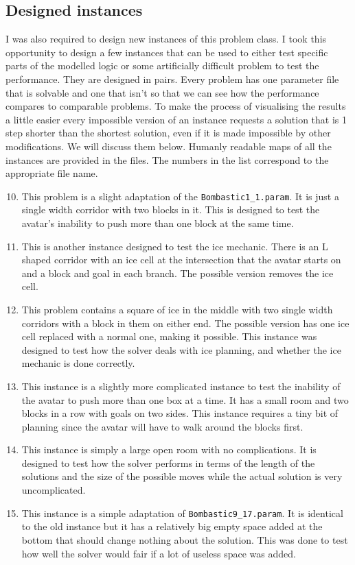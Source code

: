 \documentclass[british]{article}
\newcommand{\code}[1]{\texttt{#1}}
\begin{document}
	\subsection{Designed instances}
	I was also required to design new instances of this problem class. I took this opportunity to design a few instances that can be used to either test specific parts of the modelled logic or some artificially difficult problem to test the performance. They are designed in pairs. Every problem has one parameter file that is solvable and one that isn't so that we can see how the performance compares to comparable problems. To make the process of visualising the results a little easier every impossible version of an instance requests a solution that is 1 step shorter than the shortest solution, even if it is made impossible by other modifications. We will discuss them below. Humanly readable maps of all the instances are provided in the files. The numbers in the list correspond to the appropriate file name. 
	\begin{enumerate}[1)]
		\setcounter{enumi}{9}
		\item This problem is a slight adaptation of the \code{Bombastic1\_1.param}. It is just a single width corridor with two blocks in it. This is designed to test the avatar's inability to push more than one block at the same time.
		\item This is another instance designed to test the ice mechanic. There is an L shaped corridor with an ice cell at the intersection that the avatar starts on and a block and goal in each branch. The possible version removes the ice cell. 
		\item This problem contains a square of ice in the middle with two single width corridors with a block in them on either end. The possible version has one ice cell replaced with a normal one, making it possible. This instance was designed to test how the solver deals with ice planning, and whether the ice mechanic is done correctly. 
		\item This instance is a slightly more complicated instance to test the inability of the avatar to push more than one box at a time. It has a small room and two blocks in a row with goals on two sides. This instance requires a tiny bit of planning since the avatar will have to walk around the blocks first.
		\item This instance is simply a large open room with no complications. It is designed to test how the solver performs in terms of the length of the solutions and the size of the possible moves while the actual solution is very uncomplicated.
		\item  This instance is a simple adaptation of \code{Bombastic9\_17.param}.  It is identical to the old instance but it has a relatively big empty space added at the bottom that should change nothing about the solution. This was done to test how well the solver would fair if a lot of useless space was added.
	\end{enumerate}
	
\end{document}
